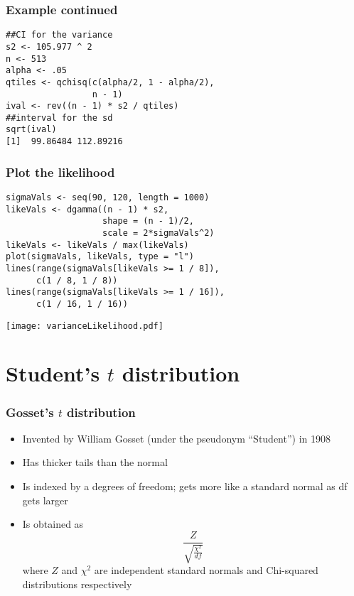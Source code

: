 \documentclass[aspectratio=169]{beamer}
\begin{document}
\begin{frame}[fragile]\frametitle{Example continued}
\begin{verbatim}
##CI for the variance
s2 <- 105.977 ^ 2
n <- 513
alpha <- .05
qtiles <- qchisq(c(alpha/2, 1 - alpha/2), 
                 n - 1)
ival <- rev((n - 1) * s2 / qtiles)
##interval for the sd
sqrt(ival)
[1]  99.86484 112.89216
\end{verbatim}
\end{frame}

\begin{frame}[fragile]\frametitle{Plot the likelihood}
\begin{verbatim}
sigmaVals <- seq(90, 120, length = 1000)
likeVals <- dgamma((n - 1) * s2,
                   shape = (n - 1)/2,
                   scale = 2*sigmaVals^2)
likeVals <- likeVals / max(likeVals)
plot(sigmaVals, likeVals, type = "l")
lines(range(sigmaVals[likeVals >= 1 / 8]), 
      c(1 / 8, 1 / 8))
lines(range(sigmaVals[likeVals >= 1 / 16]), 
      c(1 / 16, 1 / 16))
\end{verbatim}
\end{frame}


\begin{frame}
\texttt{[image: varianceLikelihood.pdf]}
\end{frame}

\section{Student's $t$ distribution}
\begin{frame}\frametitle{Gosset's $t$ distribution}
\begin{itemize}
\item Invented by William Gosset (under the pseudonym ``Student'') in 1908
\item Has thicker tails than the normal
\item Is indexed by a degrees of freedom; gets more like a standard
  normal as df gets larger
\item Is obtained as 
$$
\frac{Z}{\sqrt{\frac{\chi^2}{df}}}
$$
where $Z$ and $\chi^2$ are independent standard normals and
Chi-squared distributions respectively
\end{itemize}
\end{frame}
\end{document}
